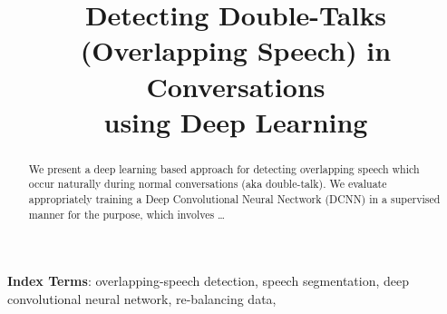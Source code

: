 \documentclass[a4paper]{article}
\title{
       Detecting Double-Talks (Overlapping Speech) in Conversations\\
       using Deep Learning
}
\begin{document}
\maketitle

\newcommand{\outline}[1]{}  %
\newcommand{\widom}[1]{}  %

\begin{abstract}
\widom{
       - the problem,
       - the approach and solutions
       - the main contributions of the paper.
       - little if any background and motivation. address the experts.
       - factual but comprehensive.
}

We present a deep learning based approach for detecting overlapping speech which occur naturally during normal conversations (aka double-talk).
We evaluate appropriately training a Deep Convolutional Neural Nectwork (DCNN) in a supervised manner for the purpose,
which involves \ldots

\end{abstract}

\noindent\textbf{Index Terms}:
overlapping-speech detection,
speech segmentation,
deep convolutional neural network,
re-balancing data,

\end{document}
